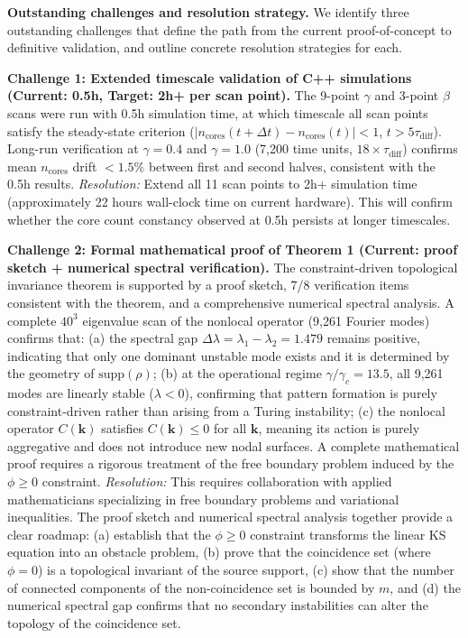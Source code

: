 \documentclass[sn-nature,pdflatex]{sn-jnl}
\begin{document}
\bigskip\noindent\textbf{Outstanding challenges and resolution strategy.}
We identify three outstanding challenges that define the path from the current proof-of-concept to definitive validation, and outline concrete resolution strategies for each.

\medskip
\noindent\textbf{Challenge 1: Extended timescale validation of C++ simulations (Current: 0.5h, Target: 2h+ per scan point).}
The 9-point $\gamma$ and 3-point $\beta$ scans were run with 0.5h simulation time, at which timescale all scan points satisfy the steady-state criterion ($|n_{\text{cores}}(t + \Delta t) - n_{\text{cores}}(t)| < 1$, $t > 5\tau_{\text{diff}}$). Long-run verification at $\gamma = 0.4$ and $\gamma = 1.0$ (7,200 time units, $18\times\tau_{\text{diff}}$) confirms mean $n_{\text{cores}}$ drift $<1.5\%$ between first and second halves, consistent with the 0.5h results.
\textit{Resolution:} Extend all 11 scan points to 2h+ simulation time (approximately 22 hours wall-clock time on current hardware). This will confirm whether the core count constancy observed at 0.5h persists at longer timescales.

\medskip
\noindent\textbf{Challenge 2: Formal mathematical proof of Theorem 1 (Current: proof sketch + numerical spectral verification).}
The constraint-driven topological invariance theorem is supported by a proof sketch, 7/8 verification items consistent with the theorem, and a comprehensive numerical spectral analysis.
A complete $40^3$ eigenvalue scan of the nonlocal operator (9,261 Fourier modes) confirms that: (a) the spectral gap $\Delta\lambda = \lambda_1 - \lambda_2 = 1.479$ remains positive, indicating that only one dominant unstable mode exists and it is determined by the geometry of $\text{supp}(\rho)$; (b) at the operational regime $\gamma/\gamma_c = 13.5$, all 9,261 modes are linearly stable ($\lambda < 0$), confirming that pattern formation is purely constraint-driven rather than arising from a Turing instability; (c) the nonlocal operator $C(\mathbf{k})$ satisfies $C(\mathbf{k}) \le 0$ for all $\mathbf{k}$, meaning its action is purely aggregative and does not introduce new nodal surfaces.
A complete mathematical proof requires a rigorous treatment of the free boundary problem induced by the $\phi \ge 0$ constraint.
\textit{Resolution:} This requires collaboration with applied mathematicians specializing in free boundary problems and variational inequalities.
The proof sketch and numerical spectral analysis together provide a clear roadmap: (a) establish that the $\phi \ge 0$ constraint transforms the linear KS equation into an obstacle problem, (b) prove that the coincidence set (where $\phi = 0$) is a topological invariant of the source support, (c) show that the number of connected components of the non-coincidence set is bounded by $m$, and (d) the numerical spectral gap confirms that no secondary instabilities can alter the topology of the coincidence set.
\end{document}
